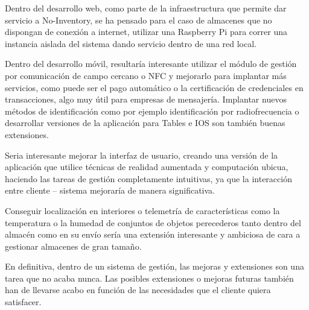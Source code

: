 \documentclass[a4paper,11pt]{book}
\begin{document}
Dentro del desarrollo web, como parte de la infraestructura que permite dar servicio a No-Inventory, se ha pensado para el caso de almacenes que no dispongan de conexión a internet, utilizar una Raspberry Pi para correr una instancia aislada del sistema dando servicio dentro de una red local. 


Dentro del desarrollo móvil, resultaría interesante utilizar el módulo de gestión por comunicación de campo cercano o NFC y mejorarlo para implantar más servicios, como puede ser el pago automático o la certificación de credenciales en transacciones, algo  muy útil para empresas de mensajería. Implantar nuevos métodos de identificación como por ejemplo identificación por radiofrecuencia  o desarrollar versiones de la aplicación para Tables e IOS son también buenas extensiones.  

Seria interesante mejorar la interfaz de usuario, creando una versión de la aplicación que utilice técnicas de realidad aumentada y computación ubicua,  haciendo las tareas de gestión completamente intuitivas, ya que la interacción entre cliente – sistema mejoraría de manera significativa. 

Conseguir localización en interiores  o telemetría de características como la temperatura o la humedad de conjuntos de objetos perecederos tanto dentro del almacén como en su envío sería una extensión interesante y ambiciosa de cara a gestionar almacenes de gran tamaño. 

En definitiva, dentro de un sistema de gestión, las mejoras y extensiones son una tarea que no acaba nunca. Las posibles extensiones o mejoras futuras también han de llevarse acabo en función de las necesidades que el cliente quiera satisfacer. 
\end{document}
